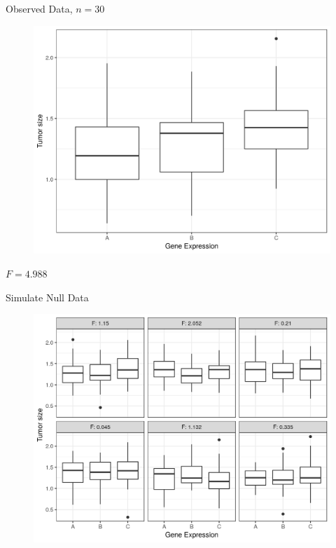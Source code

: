 \documentclass{beamer}
\begin{document}
\begin{frame}{Observed Data, $n=30$}
\begin{figure}
  \includegraphics[scale=0.5]{simulation/observed-plot}
\end{figure}
\centering
$F = 4.988$
\end{frame}


\begin{frame}{Simulate Null Data}
\begin{figure}
  \includegraphics[scale=0.60]{simulation/null-plots}
\end{figure}
\end{frame}
\end{document}
